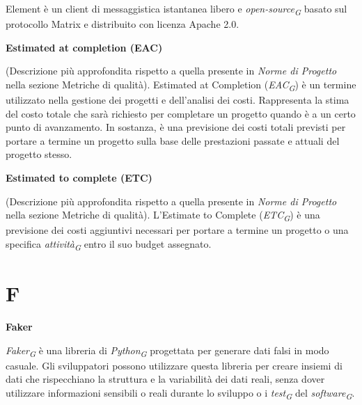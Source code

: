 \documentclass{article}
\begin{document}
\vspace{0.1cm}

Element è un client di messaggistica istantanea libero e \textit{open-source}\textsubscript{\textit{G}} basato sul protocollo Matrix e distribuito con licenza Apache 2.0.

\vspace{0.4cm}

\textbf{Estimated at completion (EAC)}

\vspace{0.1cm}

(Descrizione più approfondita rispetto a quella presente in \textit{Norme di Progetto} nella sezione Metriche di qualità). Estimated at Completion (\textit{EAC}\textsubscript{\textit{G}}) è un termine utilizzato nella gestione dei progetti e dell'analisi dei costi. Rappresenta la stima del costo totale che sarà richiesto per completare un progetto quando è a un certo punto di avanzamento. In sostanza, è una previsione dei costi totali previsti per portare a termine un progetto sulla base delle prestazioni passate e attuali del progetto stesso.

\vspace{0.4cm}

\textbf{Estimated to complete (ETC)}

\vspace{0.1cm}

(Descrizione più approfondita rispetto a quella presente in \textit{Norme di Progetto} nella sezione Metriche di qualità). L'Estimate to Complete (\textit{ETC}\textsubscript{\textit{G}}) è una previsione dei costi aggiuntivi necessari per portare a termine un progetto o una specifica \textit{attività}\textsubscript{\textit{G}} entro il suo budget assegnato.

\pagebreak
\section*{F}
{}

\vspace{0.4cm}

\textbf{Faker}

\vspace{0.1cm}

\textit{Faker}\textsubscript{\textit{G}} è una libreria di \textit{Python}\textsubscript{\textit{G}} progettata per generare dati falsi in modo casuale. Gli sviluppatori possono utilizzare questa libreria per creare insiemi di dati che rispecchiano la struttura e la variabilità dei dati reali, senza dover utilizzare informazioni sensibili o reali durante lo sviluppo o i \textit{test}\textsubscript{\textit{G}} del \textit{software}\textsubscript{\textit{G}}.
\end{document}
